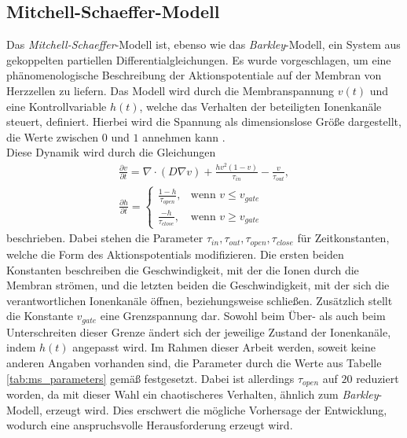 \subsection{Mitchell-Schaeffer-Modell}
Das \textit{Mitchell-Schaeffer}-Modell ist, ebenso wie das \textit{Barkley}-Modell, ein System aus gekoppelten partiellen Differentialgleichungen. Es wurde vorgeschlagen, um eine phänomenologische Beschreibung der Aktionspotentiale auf der Membran von Herzzellen zu liefern. Das Modell wird durch die Membranspannung $v(t)$ und eine Kontrollvariable $h(t)$, welche das Verhalten der beteiligten Ionenkanäle steuert, definiert. Hierbei wird die Spannung als dimensionslose Größe dargestellt, die Werte zwischen $0$ und $1$ annehmen kann \citep{mitchell2003two}.\\

Diese Dynamik wird durch die Gleichungen 
\begin{equation}
\begin{gathered}
\frac{\partial v}{\partial t} = \nabla \cdot (D \nabla v) + \frac{h v^2(1-v)}{\tau_{in}} - \frac{v}{\tau_{out}},\\
\frac{\partial h}{\partial t} =
\begin{cases}
	\frac{1-h}{\tau_{open}},& \text{wenn } v \leq v_{gate}\\
    \frac{-h}{\tau_{close}},& \text{wenn } v \geq v_{gate}
\end{cases}
\end{gathered}
\end{equation}
beschrieben. Dabei stehen die Parameter $\tau_{in}, \tau_{out}, \tau_{open}, \tau_{close}$ für Zeitkonstanten, welche die Form des Aktionspotentials modifizieren. Die ersten beiden Konstanten beschreiben die Geschwindigkeit, mit der die Ionen durch die Membran strömen, und die letzten beiden die Geschwindigkeit, mit der sich die verantwortlichen Ionenkanäle öffnen, beziehungsweise schließen. Zusätzlich stellt die Konstante $v_{gate}$ eine Grenzspannung dar. Sowohl beim Über- als auch beim Unterschreiten dieser Grenze ändert sich der jeweilige Zustand der Ionenkanäle, indem $h(t)$ angepasst wird. Im Rahmen dieser Arbeit werden, soweit keine anderen Angaben vorhanden sind, die Parameter durch die Werte aus Tabelle \ref{tab:ms_parameters} gemäß \citep{mitchell2003two} festgesetzt. Dabei ist allerdings $\tau_{open}$ auf $20$ \citep[S. 134ff.]{bartocci2016computational} reduziert worden, da mit dieser Wahl ein chaotischeres Verhalten, ähnlich zum \textit{Barkley}-Modell, erzeugt wird. Dies erschwert die mögliche Vorhersage der Entwicklung, wodurch eine anspruchsvolle Herausforderung erzeugt wird.\\

